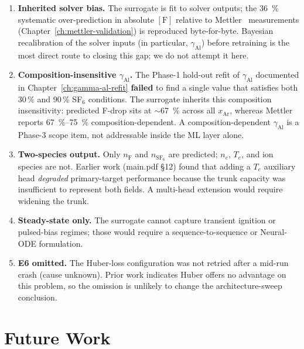 \begin{enumerate}[itemsep=2pt,topsep=2pt]
  \item \textbf{Inherited solver bias.} The surrogate is fit to solver
  outputs; the \SI{36}{\percent} systematic over-prediction in absolute
  $[\mathrm{F}]$ relative to Mettler~\cite{mettler2025} measurements
  (Chapter~\ref{ch:mettler-validation}) is reproduced byte-for-byte.
  Bayesian recalibration of the solver inputs (in particular,
  $\gamma_\mathrm{Al}$) before retraining is the most direct route to
  closing this gap; we do not attempt it here.
  \item \textbf{Composition-insensitive $\gamma_\mathrm{Al}$.} The Phase-1
  hold-out refit of $\gamma_\mathrm{Al}$ documented in
  Chapter~\ref{ch:gamma-al-refit} \textbf{failed} to find a single value that
  satisfies both 30\,\% and 90\,\% SF$_6$ conditions. The surrogate
  inherits this composition insensitivity: predicted F-drop sits at
  $\sim$\SI{67}{\percent} across all $x_\mathrm{Ar}$, whereas Mettler reports
  \SIrange{67}{75}{\percent} composition-dependent. A composition-dependent
  $\gamma_\mathrm{Al}$ is a Phase-3 scope item, not addressable inside the ML
  layer alone.
  \item \textbf{Two-species output.} Only $n_\mathrm{F}$ and
  $n_{\mathrm{SF}_6}$ are predicted; $n_e$, $T_e$, and ion species are not.
  Earlier work (main.pdf §12) found that adding a $T_e$ auxiliary head
  \emph{degraded} primary-target performance because the trunk capacity
  was insufficient to represent both fields. A multi-head extension would
  require widening the trunk.
  \item \textbf{Steady-state only.} The surrogate cannot capture transient
  ignition or pulsed-bias regimes; those would require a sequence-to-sequence
  or Neural-ODE formulation.
  \item \textbf{E6 omitted.} The Huber-loss configuration was not retried
  after a mid-run crash (cause unknown). Prior work indicates Huber offers
  no advantage on this problem, so the omission is unlikely to change the
  architecture-sweep conclusion.
\end{enumerate}

\section{Future Work}
\label{sec:ml-future}

